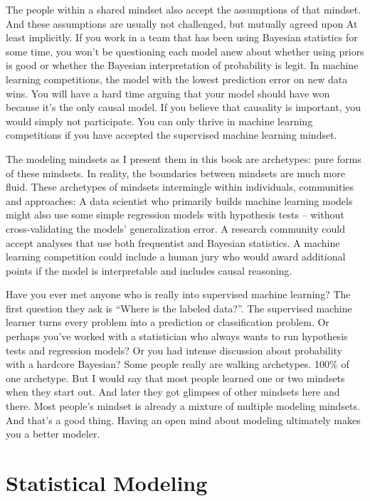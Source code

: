 \documentclass[
  10pt,
]{scrbook}
\begin{document}
The people within a shared mindset also accept the assumptions of that mindset.
And these assumptions are usually not challenged, but mutually agreed upon
At least implicitly.
If you work in a team that has been using Bayesian statistics for some time, you won't be questioning each model anew about whether using priors is good or whether the Bayesian interpretation of probability is legit.
In machine learning competitions, the model with the lowest prediction error on new data wins.
You will have a hard time arguing that your model should have won because it's the only causal model.
If you believe that causality is important, you would simply not participate.
You can only thrive in machine learning competitions if you have accepted the supervised machine learning mindset.

The modeling mindsets as I present them in this book are archetypes: pure forms of these mindsets.
In reality, the boundaries between mindsets are much more fluid.
These archetypes of mindsets intermingle within individuals, communities and approaches:
A data scientist who primarily builds machine learning models might also use some simple regression models with hypothesis tests -- without cross-validating the models' generalization error.
A research community could accept analyses that use both frequentist and Bayesian statistics.
A machine learning competition could include a human jury who would award additional points if the model is interpretable and includes causal reasoning.

Have you ever met anyone who is really into supervised machine learning?
The first question they ask is ``Where is the labeled data?''.
The supervised machine learner turns every problem into a prediction or classification problem.
Or perhaps you've worked with a statistician who always wants to run hypothesis tests and regression models?
Or you had intense discussion about probability with a hardcore Bayesian?
Some people really are walking archetypes. 100\% of one archetype.
But I would say that most people learned one or two mindsets when they start out.
And later they got glimpses of other mindsets here and there.
Most people's mindset is already a mixture of multiple modeling mindsets.
And that's a good thing.
Having an open mind about modeling ultimately makes you a better modeler.

\hypertarget{statistical-modeling}{%
\chapter{Statistical Modeling}\label{statistical-modeling}}
\end{document}
